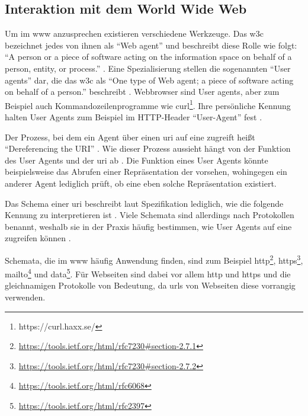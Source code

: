     \subsection{Interaktion mit dem World Wide Web}
        Um {\resources} im \gls{www} anzusprechen existieren verschiedene Werkzeuge.
        Das \gls{w3c} bezeichnet jedes von ihnen als
        "`Web agent"' und beschreibt diese Rolle wie folgt:
        "`A person or a piece of software acting on the information
        space on behalf of a person, entity, or process."' \cite[Kapitel 6]{w3c:wwwArch}.
        Eine Spezialisierung stellen die sogenannten "`User agents"' dar,
        die das \gls{w3c} als "`One type of Web agent;
        a piece of software acting on behalf of a person."' beschreibt \cite[Kapitel 6]{w3c:wwwArch}.
        Webbrowser sind User agents, aber zum Beispiel auch Kommandozeilenprogramme
        wie curl\footnote{https://curl.haxx.se/}.
        Ihre persönliche Kennung halten User Agents zum Beispiel im
        HTTP-Header "`User-Agent"' fest \cite[Kapitel 5.5.3, Seite 46]{rfc:7231}.

        Der Prozess, bei dem ein Agent über einen \gls{uri} auf eine {\resource}
        zugreift heißt "`Dereferencing the URI"' \cite[Kapitel 3.1]{w3c:wwwArch}.
        Wie dieser Prozess aussieht hängt von der Funktion des User Agents und der \gls{uri} ab
        \cite[Kapitel 3.1]{w3c:wwwArch}.
        Die Funktion eines User Agents könnte beispielsweise das Abrufen einer
        Repräsentation der {\resource} vorsehen, wohingegen ein anderer Agent
        lediglich prüft, ob eine eben solche Repräsentation existiert.

        Das Schema einer \gls{uri} beschreibt laut Spezifikation
        lediglich, wie die folgende Kennung zu interpretieren ist
        \cite[Kapitel 3.1, Seite 17]{rfc:3986}.
        Viele Schemata sind allerdings nach Protokollen benannt,
        weshalb sie in der Praxis häufig bestimmen,
        wie User Agents auf eine {\resource} zugreifen können
        \cite[Kapitel 3.1]{w3c:wwwArch}.
        
        Schemata, die im \gls{www} häufig Anwendung finden,
        sind zum Beispiel
        http\footnote{\url{https://tools.ietf.org/html/rfc7230\#section-2.7.1}},
        https\footnote{\url{https://tools.ietf.org/html/rfc7230\#section-2.7.2}},
        mailto\footnote{\url{https://tools.ietf.org/html/rfc6068}} und
        data\footnote{\url{https://tools.ietf.org/html/rfc2397}}.
        Für Webseiten sind dabei vor allem http und https
        und die gleichnamigen Protokolle von Bedeutung,
        da \glspl{url} von Webseiten diese vorrangig verwenden.

